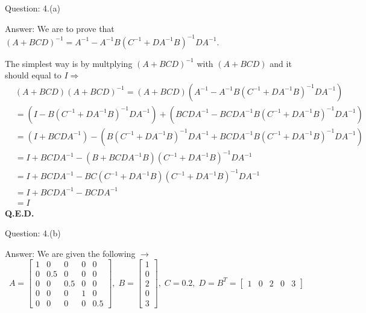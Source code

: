 \documentclass[a4paper]{article}
\begin{document}
\begin{qalist}
		\item[Question: 4.(a)] \setcounter{equation}{0}
		\item[Answer:] We are to prove that ${(A + BCD)}^{-1} = {A}^{-1} - {A}^{-1}B{({C}^{-1} + D{A}^{-1}B)}^{-1}D{A}^{-1}$.
		
		The simplest way is by multplying ${(A + BCD)}^{-1}$ with $(A + BCD)$ and it should equal to $I \Rightarrow$
		\begin{align}
			& (A + BCD){(A + BCD)}^{-1} = \left(A + BCD\right)\left({A}^{-1} - {A}^{-1}B{({C}^{-1} + D{A}^{-1}B)}^{-1}D{A}^{-1}\right) \\
			&= \left(I - B{({C}^{-1} + D{A}^{-1}B)}^{-1}D{A}^{-1}\right) + \left(BCD{A}^{-1} - BCD{A}^{-1}B{({C}^{-1} + D{A}^{-1}B)}^{-1}D{A}^{-1}\right) \\
			&=\left(I+BCD{A}^{-1}\right) - \left(B{({C}^{-1} + D{A}^{-1}B)}^{-1}D{A}^{-1} + BCD{A}^{-1}B{({C}^{-1} + D{A}^{-1}B)}^{-1}D{A}^{-1}\right) \\
			&=I + BCD{A}^{-1} - (B + BCD{A}^{-1}B){({C}^{-1} + D{A}^{-1}B)}^{-1}D{A}^{-1} \\
			&=I + BCD{A}^{-1} - BC({C}^{-1} + D{A}^{-1}B){({C}^{-1} + D{A}^{-1}B)}^{-1}D{A}^{-1} \\
			&=I + BCD{A}^{-1} -BCD{A}^{-1} \\
			&= I
		\end{align}
		\textbf{Q.E.D.}
		
		\item[Question: 4.(b)] \setcounter{equation}{0}
		\item[Answer:] We are given the following $\rightarrow$ 
			\begin{equation}
				A = \begin{bmatrix}
					1 & 0 & 0 & 0 & 0 \\
					0 & 0.5 & 0 & 0 & 0 \\
					0 & 0 & 0.5 & 0 & 0 \\
					0 & 0 & 0 & 1 & 0 \\
					0 & 0 & 0 & 0 & 0.5
				\end{bmatrix},\;
				B = \begin{bmatrix}1 \\ 0 \\ 2 \\ 0 \\3\end{bmatrix},\; C = 0.2,\; D = {B}^{T} = \begin{bmatrix}1 & 0 & 2 & 0 &3\end{bmatrix}
			\end{equation}
			

\end{qalist}
\end{document}
